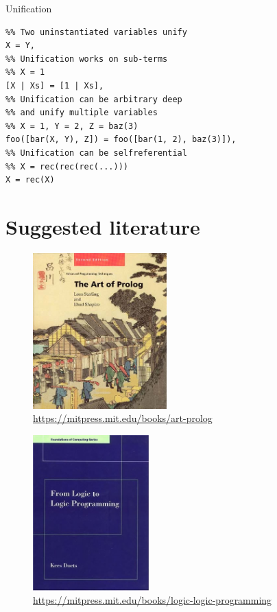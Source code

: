 \documentclass[presentation]{beamer}
\begin{document}
\begin{frame}[fragile,label=sec-1-8]{Unification}
 \begin{verbatim}
%% Two uninstantiated variables unify
X = Y,
%% Unification works on sub-terms
%% X = 1
[X | Xs] = [1 | Xs],
%% Unification can be arbitrary deep
%% and unify multiple variables
%% X = 1, Y = 2, Z = baz(3)
foo([bar(X, Y), Z]) = foo([bar(1, 2), baz(3)]),
%% Unification can be selfreferential
%% X = rec(rec(rec(...)))
X = rec(X)
\end{verbatim}
\end{frame}

\section{Suggested literature}
\label{sec-2}
\begin{figure}[htb]
\centering
\includegraphics[height=6cm]{./images/the-art-of-prolog.jpg}
\caption{\url{https://mitpress.mit.edu/books/art-prolog}}
\end{figure}

\begin{figure}[htb]
\centering
\includegraphics[height=6cm]{./images/from-logic-to-logic-programming.jpg}
\caption{\url{https://mitpress.mit.edu/books/logic-logic-programming}}
\end{figure}
\end{document}

